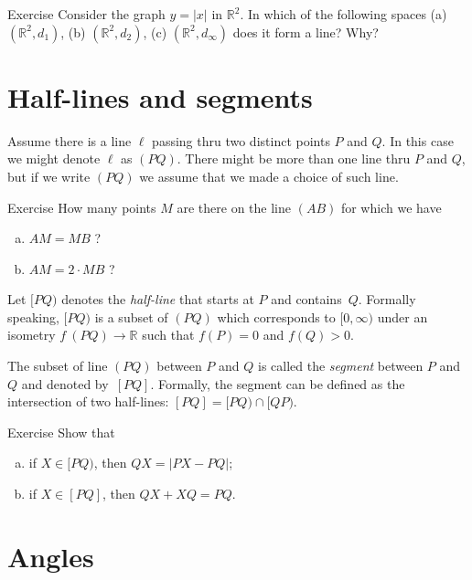 \begin{thm}{Exercise}\label{ex:y=|x|}
Consider the graph $y=|x|$ in $\mathbb{R}^2$.
In which of the following spaces 
(a) $(\mathbb{R}^2,d_1)$, 
(b) $(\mathbb{R}^2,d_2)$, 
(c) $(\mathbb{R}^2,d_\infty)$ 
does it form a line? 
Why?
\end{thm}

\section*{Half-lines and segments}

Assume there is a line $\ell$ passing thru
two distinct points $P$ and $Q$.
In this case we might denote $\ell$ as $(PQ)$.
There might be more than one line thru $P$ and $Q$,
but if we write \index{60@$(PQ)$, $[PQ)$, $[PQ]$}$(PQ)$ we assume that we made a choice of such line. 

\begin{thm}{Exercise}\label{ex:2mid}
How many points $M$ are there on the line $(A B)$ for which we have
\begin{enumerate}[(a)]
\item $AM= MB$ ?
\item $AM= 2\cdot MB$ ?
\end{enumerate}
\end{thm}

Let $[P Q)$ denotes the \emph{half-line}
that starts at $P$ and contains~$Q$. 
Formally speaking, $[P Q)$ is a subset of $(P Q)$ which corresponds to $[0,\infty)$ under an isometry $f\:(P Q)\to \mathbb{R}$ such that $f(P)=0$ and $f(Q)>0$.

The subset of line $(P Q)$ between $P$ and $Q$ is called the \emph{segment} between $P$ and $Q$ and denoted by~$[P Q]$.
Formally, the segment can be defined as the intersection of two half-lines: $[P Q]=[P Q)\cap[Q P)$.

\begin{thm}{Exercise}\label{ex:trig==}
Show that 
\begin{enumerate}[(a)]
\item if $X\in [PQ)$, then 
$QX=|PX-PQ|$;
\item if $X\in [PQ]$, then 
$QX+XQ=PQ$.
\end{enumerate}

\end{thm}


\section*{Angles}

